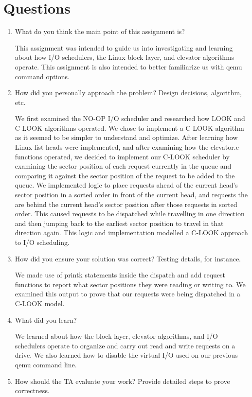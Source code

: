 \documentclass[letterpaper,10pt,fleqn]{article}
\begin{document}
\section*{Questions}
\begin{enumerate}
\item What do you think the main point of this assignment is?

This assignment was intended to guide us into investigating and learning about how I/O schedulers, the Linux block layer, and elevator algorithms operate. This assignment is also intended to better familiarize us with qemu command options.

\item How did you personally approach the problem? Design decisions, algorithm, etc. 

We first examined the NO-OP I/O scheduler and researched how LOOK and C-LOOK algorithms operated. We chose to implement a C-LOOK algorithm as it seemed to be simpler to understand and optimize. After learning how Linux list heads were implemented, and after examining how the elevator.c functions operated, we decided to implement our C-LOOK scheduler by examining the sector position of each request currently in the queue and comparing it against the sector position of the request to be added to the queue. We implemented logic to place requests ahead of the current head's sector position in a sorted order in front of the current head, and requests the are behind the current head's sector position after those requests in sorted order. This caused requests to be dispatched while travelling in one direction and then jumping back to the earliest sector position to travel in that direction again. This logic and implementation modelled a C-LOOK approach to I/O scheduling.

\item How did you ensure your solution was correct? Testing details, for instance. 

We made use of printk statements inside the dispatch and add request functions to report what sector positions they were reading or writing to. We examined this output to prove that our requests were being dispatched in a C-LOOK model.

\item What did you learn? 

We learned about how the block layer, elevator algorithms, and I/O schedulers operate to organize and carry out read and write requests on a drive. We also learned how to disable the virtual I/O used on our previous qemu command line.

\item How should the TA evaluate your work? Provide detailed steps to prove correctness.



\end{enumerate}

\begin{thebibliography}{9}

\end{thebibliography}
\end{document}
